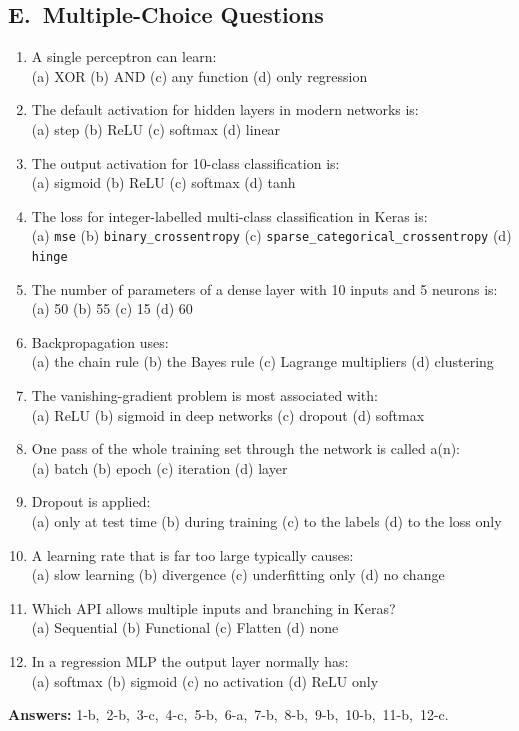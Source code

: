 \subsection*{E.\ Multiple-Choice Questions}
\begin{enumerate}
  \item A single perceptron can learn: \\
  (a) XOR \quad (b) AND \quad (c) any function \quad (d) only regression
  \item The default activation for hidden layers in modern networks is: \\
  (a) step \quad (b) ReLU \quad (c) softmax \quad (d) linear
  \item The output activation for 10-class classification is: \\
  (a) sigmoid \quad (b) ReLU \quad (c) softmax \quad (d) tanh
  \item The loss for integer-labelled multi-class classification in Keras is: \\
  (a) \texttt{mse} \quad (b) \texttt{binary\_crossentropy} \quad (c) \texttt{sparse\_categorical\_crossentropy} \quad (d) \texttt{hinge}
  \item The number of parameters of a dense layer with 10 inputs and 5 neurons is: \\
  (a) 50 \quad (b) 55 \quad (c) 15 \quad (d) 60
  \item Backpropagation uses: \\
  (a) the chain rule \quad (b) the Bayes rule \quad (c) Lagrange multipliers \quad (d) clustering
  \item The vanishing-gradient problem is most associated with: \\
  (a) ReLU \quad (b) sigmoid in deep networks \quad (c) dropout \quad (d) softmax
  \item One pass of the whole training set through the network is called a(n): \\
  (a) batch \quad (b) epoch \quad (c) iteration \quad (d) layer
  \item Dropout is applied: \\
  (a) only at test time \quad (b) during training \quad (c) to the labels \quad (d) to the loss only
  \item A learning rate that is far too large typically causes: \\
  (a) slow learning \quad (b) divergence \quad (c) underfitting only \quad (d) no change
  \item Which API allows multiple inputs and branching in Keras? \\
  (a) Sequential \quad (b) Functional \quad (c) Flatten \quad (d) none
  \item In a regression MLP the output layer normally has: \\
  (a) softmax \quad (b) sigmoid \quad (c) no activation \quad (d) ReLU only
\end{enumerate}
\textbf{Answers:} 1-b,\ 2-b,\ 3-c,\ 4-c,\ 5-b,\ 6-a,\ 7-b,\ 8-b,\ 9-b,\ 10-b,\ 11-b,\ 12-c.

